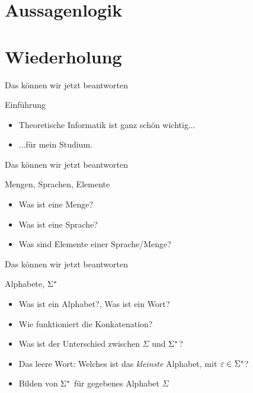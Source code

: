 


\section{Aussagenlogik}



\section{Wiederholung}
\begin{frame}[fragile]{Das können wir jetzt beantworten}
    \begin{alertblock}{Einführung}
    \begin{itemize}
        \item Theoretische Informatik ist ganz schön wichtig...
        \item ...für mein Studium.
    \end{itemize}
    \end{alertblock}
\end{frame}

\begin{frame}[fragile]{Das können wir jetzt beantworten}
    \begin{alertblock}{Mengen, Sprachen, Elemente}
    \begin{itemize}
        \item Was ist eine Menge?
        \item Was ist eine Sprache?
        \item Was sind Elemente einer Sprache/Menge?
    \end{itemize}
    \end{alertblock}
\end{frame}

\begin{frame}[fragile]{Das können wir jetzt beantworten}
    \begin{alertblock}{Alphabete, $\Sigma^{*}$}
    \begin{itemize}
        \item Was ist ein Alphabet?, Was ist ein Wort?
        \item Wie funktioniert die Konkatenation?
        \item Was ist der Unterschied zwischen $\Sigma$ und $\Sigma^{*}$?
        \item Das leere Wort: Welches ist das \textit{kleinste} Alphabet, mit $\varepsilon \in \Sigma^{*}$?
        \item Bilden von $\Sigma^{*}$ für gegebenes Alphabet $\Sigma$
    \end{itemize}
    \end{alertblock}
\end{frame}


